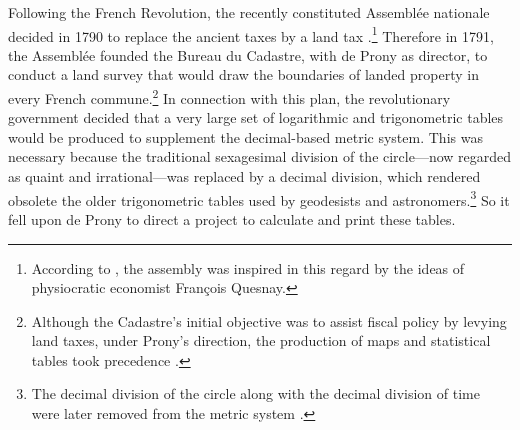 \documentclass[version=last,draft=false,paper=A4,portrait,twoside=true,twocolumn=false,headinclude=false,footinclude=false,mpinclude=true,fontsize=12,BCOR=20mm,DIV=calc,pagesize=auto,open=right,chapterprefix=true,numbers=autoendperiod,headsepline=false,headings=twolinechapter,parskip=false]{scrbook}
\begin{document}
Following the French Revolution, the recently constituted Assemblée
nationale decided in 1790 to replace the ancient taxes by a land tax
\autocite[6]{peaucelle2012a}.\footnote{According to \textcite{peaucelle2012a}, the assembly was inspired in
this regard by the ideas of physiocratic economist François Quesnay.} Therefore in 1791, the Assemblée
founded the Bureau du Cadastre, with de Prony as director, to conduct a
land survey that would draw the boundaries of landed property in every
French commune.\footnote{Although the Cadastre's initial objective was to assist fiscal
policy by levying land taxes, under Prony's direction, the production of
maps and statistical tables took precedence \autocite[p.
76]{peaucelle2012a}.} In connection with this plan, the revolutionary
government decided that a very large set of logarithmic and trigonometric
tables would be produced to supplement the decimal-based metric system.
This was necessary because the traditional sexagesimal division of the
circle---now regarded as quaint and irrational---was replaced by a decimal
division, which rendered obsolete the older trigonometric tables used by
geodesists and astronomers.\footnote{The decimal division of the circle along with the decimal division
of time were later removed from the metric system \autocite[p.
184]{daston1994}.} So it fell upon de Prony to direct a
project to calculate and print these tables.
\end{document}

